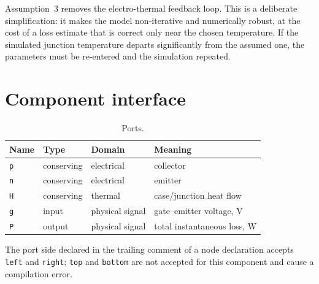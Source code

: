 \documentclass[11pt,a4paper]{article}
\newcommand{\code}[1]{\texttt{\small #1}}
\begin{document}
Assumption~3 removes the electro-thermal feedback loop. This is a deliberate
simplification: it makes the model non-iterative and numerically robust, at the
cost of a loss estimate that is correct only near the chosen temperature. If the
simulated junction temperature departs significantly from the assumed one, the
parameters must be re-entered and the simulation repeated.

\section{Component interface}

\begin{table}[h]
\centering
\caption{Ports.}
\begin{tabular}{llll}
\toprule
Name & Type & Domain & Meaning \\
\midrule
\code{p} & conserving & electrical & collector \\
\code{n} & conserving & electrical & emitter \\
\code{H} & conserving & thermal & case/junction heat flow \\
\code{g} & input & physical signal & gate--emitter voltage, \si{\volt} \\
\code{P} & output & physical signal & total instantaneous loss, \si{\watt} \\
\bottomrule
\end{tabular}
\end{table}

\noindent
The port side declared in the trailing comment of a node declaration accepts
\code{left} and \code{right}; \code{top} and \code{bottom} are not accepted for
this component and cause a compilation error.
\end{document}
